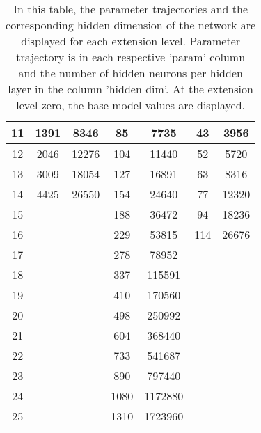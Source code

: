 \begin{table}[]
{\begin{tabular}{@{}ccccccc@{}}
    \multicolumn{1}{|c|}{11} & 1391 & \multicolumn{1}{c|}{8346} & 85 & \multicolumn{1}{c|}{7735} & 43 & \multicolumn{1}{c|}{3956} \\ \midrule
    \multicolumn{1}{|c|}{12} & 2046 & \multicolumn{1}{c|}{12276} & 104 & \multicolumn{1}{c|}{11440} & 52 & \multicolumn{1}{c|}{5720} \\ \midrule
    \multicolumn{1}{|c|}{13} & 3009 & \multicolumn{1}{c|}{18054} & 127 & \multicolumn{1}{c|}{16891} & 63 & \multicolumn{1}{c|}{8316} \\ \midrule
    \multicolumn{1}{|c|}{14} & 4425 & \multicolumn{1}{c|}{26550} & 154 & \multicolumn{1}{c|}{24640} & 77 & \multicolumn{1}{c|}{12320} \\ \midrule
    \multicolumn{1}{|c|}{15} &  & \multicolumn{1}{c|}{} & 188 & \multicolumn{1}{c|}{36472} & 94 & \multicolumn{1}{c|}{18236} \\ \midrule
    \multicolumn{1}{|c|}{16} &  & \multicolumn{1}{c|}{} & 229 & \multicolumn{1}{c|}{53815} & 114 & \multicolumn{1}{c|}{26676} \\ \midrule
    \multicolumn{1}{|c|}{17} &  & \multicolumn{1}{c|}{} & 278 & \multicolumn{1}{c|}{78952} &  & \multicolumn{1}{c|}{} \\ \midrule
    \multicolumn{1}{|c|}{18} &  & \multicolumn{1}{c|}{} & 337 & \multicolumn{1}{c|}{115591} &  & \multicolumn{1}{c|}{} \\ \midrule
    \multicolumn{1}{|c|}{19} &  & \multicolumn{1}{c|}{} & 410 & \multicolumn{1}{c|}{170560} &  & \multicolumn{1}{c|}{} \\ \midrule
    \multicolumn{1}{|c|}{20} &  & \multicolumn{1}{c|}{} & 498 & \multicolumn{1}{c|}{250992} &  & \multicolumn{1}{c|}{} \\ \midrule
    \multicolumn{1}{|c|}{21} &  & \multicolumn{1}{c|}{} & 604 & \multicolumn{1}{c|}{368440} &  & \multicolumn{1}{c|}{} \\ \midrule
    \multicolumn{1}{|c|}{22} &  & \multicolumn{1}{c|}{} & 733 & \multicolumn{1}{c|}{541687} &  & \multicolumn{1}{c|}{} \\ \midrule
    \multicolumn{1}{|c|}{23} &  & \multicolumn{1}{c|}{} & 890 & \multicolumn{1}{c|}{797440} &  & \multicolumn{1}{c|}{} \\ \midrule
    \multicolumn{1}{|c|}{24} &  & \multicolumn{1}{c|}{} & 1080 & \multicolumn{1}{c|}{1172880} &  & \multicolumn{1}{c|}{} \\ \midrule
    \multicolumn{1}{|c|}{25} &  & \multicolumn{1}{c|}{} & 1310 & \multicolumn{1}{c|}{1723960} &  & \multicolumn{1}{c|}{} \\ \bottomrule
    \end{tabular}%
    }
    \caption{In this table, the parameter trajectories and the corresponding hidden dimension of the network are displayed for each extension level. Parameter trajectory is in each respective 'param' column and the number of hidden neurons per hidden layer in the column 'hidden dim'. At the extension level zero, the base model values are displayed.}
    \label{tab:trajectory}
\end{table}


